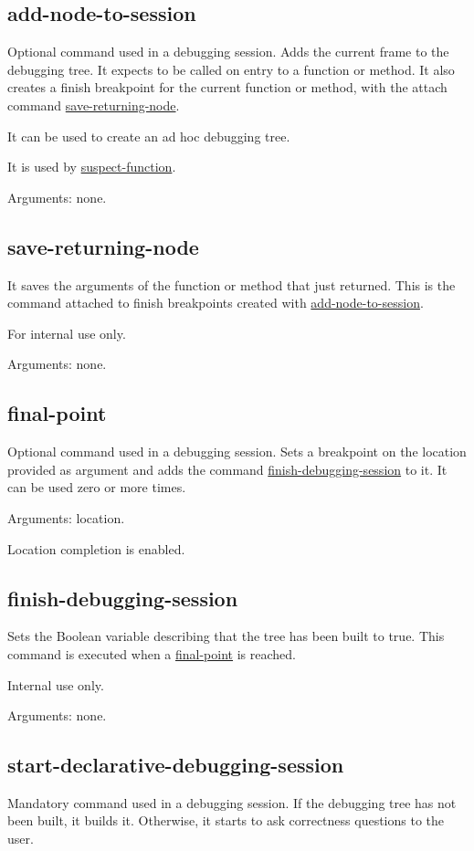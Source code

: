 \subsection{add-node-to-session}
\label{command:add-node-to-session}
Optional command used in a debugging session.
Adds the current frame to the debugging tree.
It expects to be called on entry to a function or method.
It also creates a finish breakpoint for the current function or method, with the attach command \hyperref[command:save-returning-node]{save-returning-node}.
        
It can be used to create an ad hoc debugging tree.

It is used by \hyperref[command:suspect-function]{suspect-function}.

Arguments: none.
\subsection{save-returning-node}
\label{command:save-returning-node}
It saves the arguments of the function or method that just returned.
This is the command attached to finish breakpoints created with \hyperref[command:add-node-to-session]{add-node-to-session}.

For internal use only.

Arguments: none.
\subsection{final-point}
\label{command:final-point}
Optional command used in a debugging session.
Sets a breakpoint on the location provided as argument and adds the command \hyperref[command:finish-debugging-session]{finish-debugging-session} to it.
It can be used zero or more times.

Arguments: location.

Location completion is enabled.
\subsection{finish-debugging-session}
\label{command:finish-debugging-session}
Sets the Boolean variable describing that the tree has been built to true.
This command is executed when a \hyperref[command:final-point]{final-point} is reached.

Internal use only.

Arguments: none.
\subsection{start-declarative-debugging-session}
\label{command:start-declarative-debugging-session}
Mandatory command used in a debugging session.
If the debugging tree has not been built, it builds it. Otherwise, it starts to ask correctness questions to the user. 

